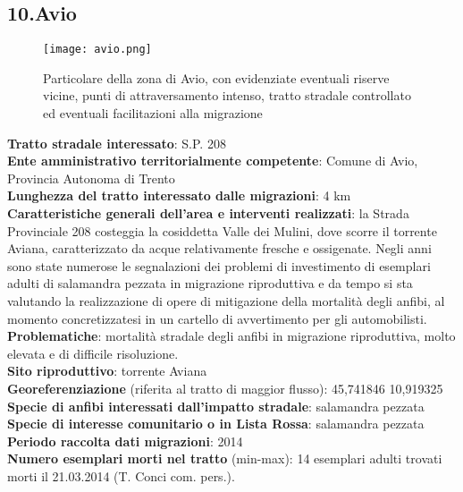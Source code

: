 \documentclass[11pt,a4paper,twoside]{memoir}
\begin{document}
\newpage
\begin{tcolorbox}[breakable,colback=white,colframe=green,width=10cm]
\subsection{10.Avio}
\end{tcolorbox}

\begin{figure}[H]
\label{fig:map_avio}
\centering
  \texttt{[image: avio.png]}
\caption{Particolare della zona di Avio, con evidenziate eventuali riserve vicine, punti di attraversamento intenso, tratto stradale controllato ed eventuali facilitazioni alla migrazione}
\end{figure}
\textbf{Tratto stradale interessato}: S.P. 208 \\
\textbf{Ente amministrativo territorialmente competente}: Comune di Avio, Provincia Autonoma di Trento \\
\textbf{Lunghezza del tratto interessato dalle migrazioni}: 4 km \\
\textbf{Caratteristiche generali dell’area e interventi realizzati}: la Strada Provinciale 208 costeggia la cosiddetta Valle dei Mulini, dove scorre il torrente Aviana, caratterizzato da acque relativamente fresche e ossigenate. Negli anni sono state numerose le segnalazioni dei problemi di investimento di esemplari adulti di salamandra pezzata in migrazione riproduttiva e da tempo si sta valutando la realizzazione di opere di mitigazione della mortalità degli anfibi, al momento concretizzatesi in un cartello di avvertimento per gli automobilisti. \\
\textbf{Problematiche}: mortalità stradale degli anfibi in migrazione riproduttiva, molto elevata e di difficile risoluzione. \\
\textbf{Sito riproduttivo}: torrente Aviana \\
\textbf{Georeferenziazione} (riferita al tratto di maggior flusso): 45,741846 10,919325 \\
\textbf{Specie di anfibi interessati dall’impatto stradale}: salamandra pezzata \\
\textbf{Specie di interesse comunitario o in Lista Rossa}: salamandra pezzata \\
\textbf{Periodo raccolta dati migrazioni}: 2014 \\
\textbf{Numero esemplari morti nel tratto} (min-max): 14 esemplari adulti trovati morti il 21.03.2014 (T. Conci com. pers.). \\
\end{document}
